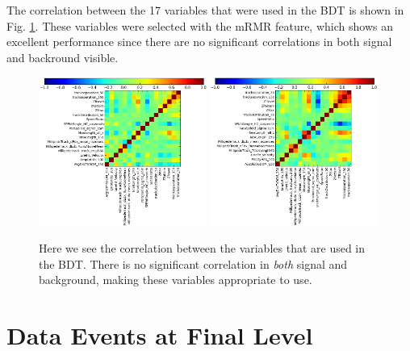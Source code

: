\begin{appendices}
\noindent The correlation between the 17 variables that were used in the BDT is shown in Fig. \ref{fig:correlation}. These variables were selected with the mRMR feature, which shows an excellent performance since there are no significant correlations in both signal and backround visible.
\begin{figure}[ht]
\centering
\includegraphics[width=0.49\textwidth]{appendix/img/correlationbackground.png}
\includegraphics[width=0.49\textwidth]{appendix/img/correlationsignal.png}
\caption{Here we see the correlation between the variables that are used in the BDT. There is no significant correlation in \textit{both} signal and background, making these variables appropriate to use.}
\label{fig:correlation}
\end{figure}

\chapter{Data Events at Final Level}
\label{ch:eventviewerFinal}


\end{appendices}
